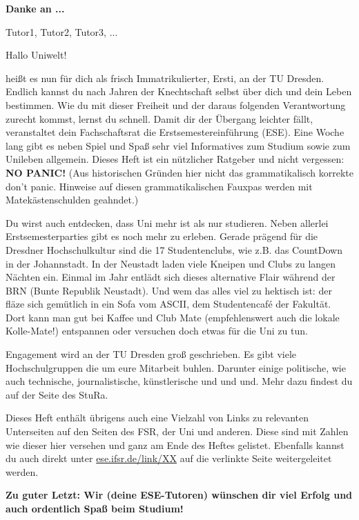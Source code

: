 \textbf{Danke an ...}

Tutor1, Tutor2, Tutor3, ...


Hallo Uniwelt!

heißt es nun für dich als frisch Immatrikulierter, Ersti, an der TU Dresden. 
Endlich kannst du nach Jahren der Knechtschaft selbst über dich und dein Leben bestimmen. 
Wie du mit dieser Freiheit und der daraus folgenden Verantwortung zurecht kommst, lernst du schnell. 
Damit dir der Übergang leichter fällt, veranstaltet dein Fachschaftsrat die Erstsemestereinführung (ESE). 
Eine Woche lang gibt es neben Spiel und Spaß sehr viel Informatives zum Studium sowie zum Unileben allgemein. 
Dieses Heft ist ein nützlicher Ratgeber und nicht vergessen: 
\textbf{NO PANIC!} (Aus historischen Gründen hier nicht das grammatikalisch korrekte \glqq don't panic\grqq. Hinweise auf diesen grammatikalischen Fauxpas werden mit Matekästenschulden geahndet.)

Du wirst auch entdecken, dass Uni mehr ist als nur studieren. 
Neben allerlei Erstsemesterparties gibt es noch mehr zu erleben. 
Gerade prägend für die Dresdner Hochschulkultur sind die 17 Studentenclubs, wie z.B. das CountDown in der Johannstadt. 
In der Neustadt laden viele Kneipen und Clubs zu langen Nächten ein. 
Einmal im Jahr entlädt sich dieses alternative Flair während der BRN (Bunte Republik Neustadt). 
Und wem das alles viel zu hektisch ist: der fläze sich gemütlich in ein Sofa vom ASCII, dem Studentencafé der Fakultät. 
Dort kann man gut bei Kaffee und Club Mate (empfehlenswert auch die lokale Kolle-Mate!) entspannen oder versuchen doch etwas für die Uni zu tun.

Engagement wird an der TU Dresden groß geschrieben. 
Es gibt viele Hochschulgruppen die um eure Mitarbeit buhlen. 
Darunter einige politische, wie auch technische, journalistische, künstlerische und und und. Mehr dazu findest du auf der Seite des StuRa.

Dieses Heft enthält übrigens auch eine Vielzahl von Links zu relevanten Unterseiten auf den Seiten des FSR, der Uni und anderen. 
Diese sind mit Zahlen wie dieser hier \link versehen und ganz am Ende des Heftes gelistet. Ebenfalls kannst du auch direkt unter \url{ese.ifsr.de/link/XX} auf die verlinkte Seite weitergeleitet werden.

\textbf{Zu guter Letzt: Wir (deine ESE-Tutoren) wünschen dir viel Erfolg und auch ordentlich Spaß beim Studium!}


